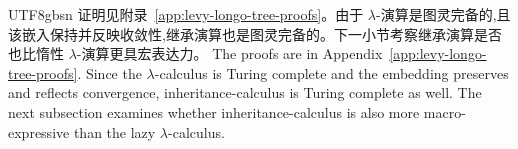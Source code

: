 \begin{CJK*}{UTF8}{gbsn}
\ifPaperChinese
证明见附录~\ref{app:levy-longo-tree-proofs}。由于 $\lambda$-演算是图灵完备的,且该嵌入保持并反映收敛性,继承演算也是图灵完备的。下一小节考察继承演算是否也比惰性 $\lambda$-演算更具宏表达力。
\else
The proofs are in Appendix~\ref{app:levy-longo-tree-proofs}.
Since the $\lambda$-calculus is Turing complete and the embedding preserves and reflects convergence,
inheritance-calculus is Turing complete as well.
The next subsection examines whether inheritance-calculus is
also more macro-expressive than the lazy $\lambda$-calculus.
\fi


\end{CJK*}
